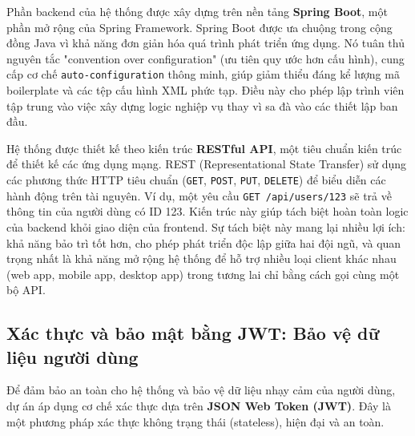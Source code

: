 \documentclass[../DoAn.tex]{subfiles}
\begin{document}
Phần backend của hệ thống được xây dựng trên nền tảng \textbf{Spring Boot}, một phần mở rộng của Spring Framework. Spring Boot được ưa chuộng trong cộng đồng Java vì khả năng đơn giản hóa quá trình phát triển ứng dụng. Nó tuân thủ nguyên tắc "convention over configuration" (ưu tiên quy ước hơn cấu hình), cung cấp cơ chế \texttt{auto-configuration} thông minh, giúp giảm thiểu đáng kể lượng mã boilerplate và các tệp cấu hình XML phức tạp. Điều này cho phép lập trình viên tập trung vào việc xây dựng logic nghiệp vụ thay vì sa đà vào các thiết lập ban đầu.

Hệ thống được thiết kế theo kiến trúc \textbf{RESTful API}, một tiêu chuẩn kiến trúc để thiết kế các ứng dụng mạng. REST (Representational State Transfer) sử dụng các phương thức HTTP tiêu chuẩn (\texttt{GET}, \texttt{POST}, \texttt{PUT}, \texttt{DELETE}) để biểu diễn các hành động trên tài nguyên. Ví dụ, một yêu cầu \texttt{GET /api/users/123} sẽ trả về thông tin của người dùng có ID 123. Kiến trúc này giúp tách biệt hoàn toàn logic của backend khỏi giao diện của frontend. Sự tách biệt này mang lại nhiều lợi ích: khả năng bảo trì tốt hơn, cho phép phát triển độc lập giữa hai đội ngũ, và quan trọng nhất là khả năng mở rộng hệ thống để hỗ trợ nhiều loại client khác nhau (web app, mobile app, desktop app) trong tương lai chỉ bằng cách gọi cùng một bộ API.

\subsection{Xác thực và bảo mật bằng JWT: Bảo vệ dữ liệu người dùng}

Để đảm bảo an toàn cho hệ thống và bảo vệ dữ liệu nhạy cảm của người dùng, dự án áp dụng cơ chế xác thực dựa trên \textbf{JSON Web Token (JWT)}. Đây là một phương pháp xác thực không trạng thái (stateless), hiện đại và an toàn.
\end{document}
